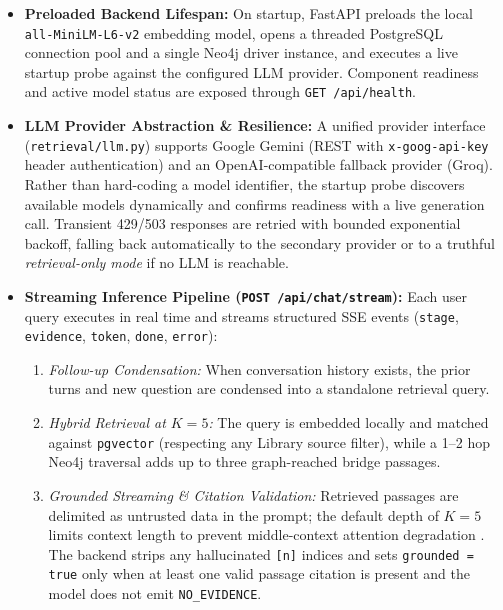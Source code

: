 \documentclass[11pt,a4paper]{article}
\begin{document}
\begin{itemize}[leftmargin=*]
  \item \textbf{Preloaded Backend Lifespan:} On startup, FastAPI preloads the local \texttt{all-MiniLM-L6-v2} embedding model, opens a threaded PostgreSQL connection pool and a single Neo4j driver instance, and executes a live startup probe against the configured LLM provider. Component readiness and active model status are exposed through \texttt{GET /api/health}.
  \item \textbf{LLM Provider Abstraction \& Resilience:} A unified provider interface (\texttt{retrieval/llm.py}) supports Google Gemini (REST with \texttt{x-goog-api-key} header authentication) and an OpenAI-compatible fallback provider (Groq). Rather than hard-coding a model identifier, the startup probe discovers available models dynamically and confirms readiness with a live generation call. Transient 429/503 responses are retried with bounded exponential backoff, falling back automatically to the secondary provider or to a truthful \emph{retrieval-only mode} if no LLM is reachable.
  \item \textbf{Streaming Inference Pipeline (\texttt{POST /api/chat/stream}):} Each user query executes in real time and streams structured SSE events (\texttt{stage}, \texttt{evidence}, \texttt{token}, \texttt{done}, \texttt{error}):
  \begin{enumerate}[nosep]
    \item \emph{Follow-up Condensation:} When conversation history exists, the prior turns and new question are condensed into a standalone retrieval query.
    \item \emph{Hybrid Retrieval at $K=5$:} The query is embedded locally and matched against \texttt{pgvector} (respecting any Library source filter), while a 1--2 hop Neo4j traversal adds up to three graph-reached bridge passages.
    \item \emph{Grounded Streaming \& Citation Validation:} Retrieved passages are delimited as untrusted data in the prompt; the default depth of $K=5$ limits context length to prevent middle-context attention degradation \cite{liu2024lost}. The backend strips any hallucinated \texttt{[n]} indices and sets \texttt{grounded = true} only when at least one valid passage citation is present and the model does not emit \texttt{NO\_EVIDENCE}.
  \end{enumerate}
\end{itemize}
\end{document}
